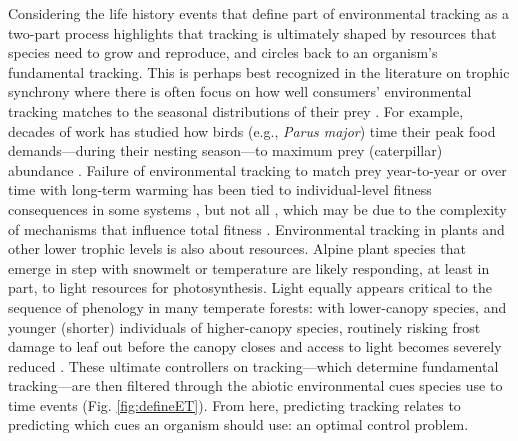 \documentclass[11pt,letterpaper]{article}
\newcommand{\R}[1]{\label{#1}\linelabel{#1}}
\begin{document}
Considering the life history events that define part of environmental tracking as a two-part process highlights that tracking is ultimately shaped by resources that species need to grow and reproduce, and circles back to an organism's fundamental tracking. This is perhaps best recognized in the literature on trophic synchrony where there is often focus on how well consumers' environmental tracking matches to the seasonal distributions of their prey \citep{deacy2018,kharouba2018}.\R{tmm2} For example, decades of work has studied how birds (e.g., \emph{Parus major}) time their peak food demands---during their nesting season---to maximum prey (caterpillar) abundance \citep[e.g.,][]{charm2008}. Failure of environmental tracking to match prey year-to-year or over time with long-term warming has been tied to individual-level fitness consequences in some systems \citep{charm2008}, but not all \citep{visser2006}, which may be due to the complexity of mechanisms that influence total fitness \citep{Singer:2010eb,Johansson2012}. Environmental tracking in plants and other lower trophic levels is also about resources. Alpine plant species that emerge in step with snowmelt or temperature are likely responding, at least in part, to light resources for photosynthesis. Light equally appears critical to the sequence of phenology in many temperate forests: with lower-canopy species, and younger (shorter) individuals of higher-canopy species, routinely risking frost damage to leaf out before the canopy closes and access to light becomes severely reduced \citep{Vitasse2013,heberling2019}. These ultimate controllers on tracking---which determine fundamental tracking---are then filtered through the abiotic environmental cues species use to time events (Fig. \ref{fig:defineET}). From here, predicting tracking relates to predicting which cues an organism should use: an optimal control problem.\R{whenhow1end}%
\end{document}
